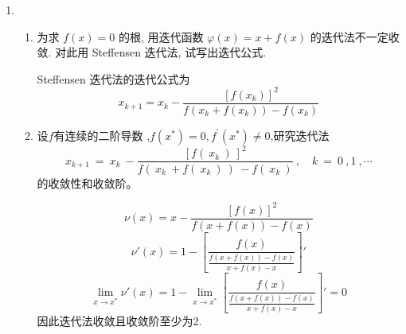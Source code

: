 \documentclass[a4paper]{article}
\begin{document}
\begin{enumerate}
  \item 
  \begin{enumerate}[label=(\arabic*)]
    \item 为求 $f(x)=0$ 的根, 用迭代函数 $\varphi(x)=x+f(x)$ 的迭代法不一定收敛. 对此用 Steffensen 迭代法, 试写出迭代公式.
    \begin{solution}
      Steffensen 迭代法的迭代公式为
      \[
      x_{k+1}=x_{k}-\frac{[f(x_{k})]^{2}}{f(x_{k}+f(x_{k}))-f(x_{k})}
      \]
    \end{solution}
    \item 设$f$有连续的二阶导数 ,$f(x^*)=0,f^\prime(x^*)\neq0$,研究迭代法$$x_{k+1}\:=\:x_{k}\:-\frac{\left[f(\:x_{k}\:)\:\right]^{2}}{f(\:x_{k}\:+f(\:x_{k}\:)\:)\:-f(\:x_{k}\:)}\:,\quad k\:=\:0\:,1\:,\cdots $$的收敛性和收敛阶。
    \begin{solution}
      \[
      \nu (x)=x-\frac{[f(x)]^{2}}{f(x+f(x))-f(x)}
      \]
      \[
      \nu'(x)=1-\left[ \frac{f(x)}{\frac{f(x+f(x))-f(x)}{x+f(x)-x}}\right]'
      \]
      \[
      \lim_{x\to x^{*}}\nu'(x)=1-\lim_{x\to x^{*}}\left[ \frac{f(x)}{\frac{f(x+f(x))-f(x)}{x+f(x)-x}}\right]'=0
      \]
      因此迭代法收敛且收敛阶至少为2.
    \end{solution}
  \end{enumerate}



\end{enumerate}
\end{document}
